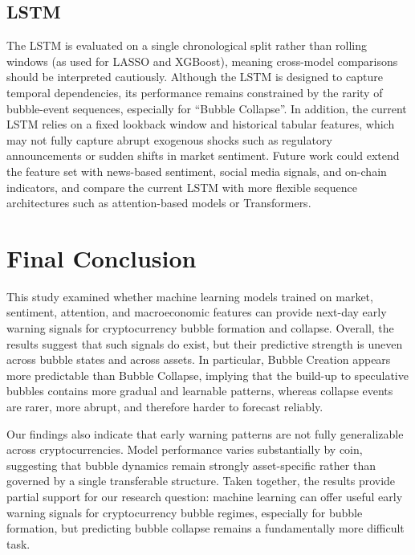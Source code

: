 \documentclass[12pt,a4paper]{article}
\begin{document}
\subsection{LSTM}
The LSTM is evaluated on a single chronological split rather than rolling windows (as used for LASSO and XGBoost), meaning cross-model comparisons should be interpreted cautiously. Although the LSTM is designed to capture temporal dependencies, its performance remains constrained by the rarity of bubble-event sequences, especially for “Bubble Collapse”. In addition, the current LSTM relies on a fixed lookback window and historical tabular features, which may not fully capture abrupt exogenous shocks such as regulatory announcements or sudden shifts in market sentiment. Future work could extend the feature set with news-based sentiment, social media signals, and on-chain indicators, and compare the current LSTM with more flexible sequence architectures such as attention-based models or Transformers.



\section{Final Conclusion}

This study examined whether machine learning models trained on market, sentiment, attention, and macroeconomic features can provide next-day early warning signals for cryptocurrency bubble formation and collapse. Overall, the results suggest that such signals do exist, but their predictive strength is uneven across bubble states and across assets. In particular, Bubble Creation appears more predictable than Bubble Collapse, implying that the build-up to speculative bubbles contains more gradual and learnable patterns, whereas collapse events are rarer, more abrupt, and therefore harder to forecast reliably.

Our findings also indicate that early warning patterns are not fully generalizable across cryptocurrencies. Model performance varies substantially by coin, suggesting that bubble dynamics remain strongly asset-specific rather than governed by a single transferable structure. Taken together, the results provide partial support for our research question: machine learning can offer useful early warning signals for cryptocurrency bubble regimes, especially for bubble formation, but predicting bubble collapse remains a fundamentally more difficult task.
\end{document}
